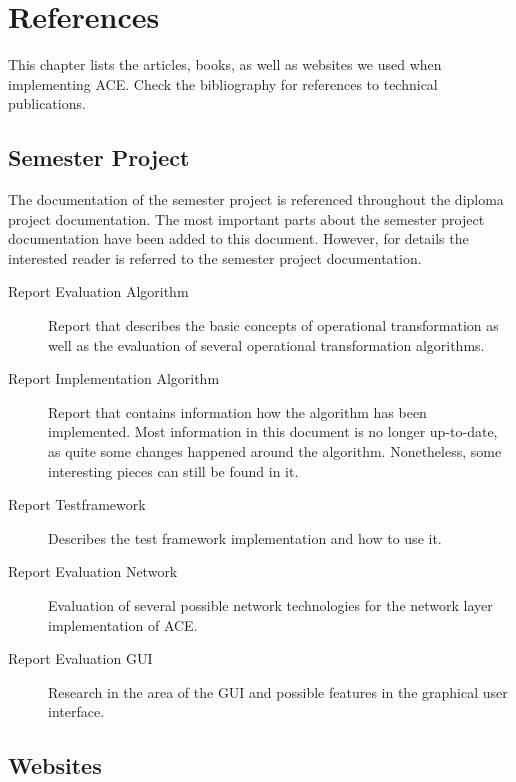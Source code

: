 \chapter{References}
\label{chapter:references}

This chapter lists the articles, books, as well as websites we used when
implementing ACE. Check the bibliography for references to technical
publications.


\section{Semester Project}
The documentation of the semester project is referenced throughout the
diploma project documentation. The most important parts about the 
semester project documentation have been added to this document. However,
for details the interested reader is referred to the semester project
documentation.

\begin{description}
 \item[Report Evaluation Algorithm] Report that describes the basic concepts of operational transformation as well as the evaluation of several operational transformation algorithms.
 \item[Report Implementation Algorithm] Report that contains information how the algorithm has been implemented. Most information in this document is no longer up-to-date, as quite some changes happened around the algorithm. Nonetheless, some interesting pieces can still be found in it.
 \item[Report Testframework] Describes the test framework implementation and how to use it.
 \item[Report Evaluation Network] Evaluation of several possible network technologies for the network layer implementation of ACE.
 \item[Report Evaluation GUI] Research in the area of the GUI and possible features in the graphical user interface.
\end{description}



\section{Websites}

